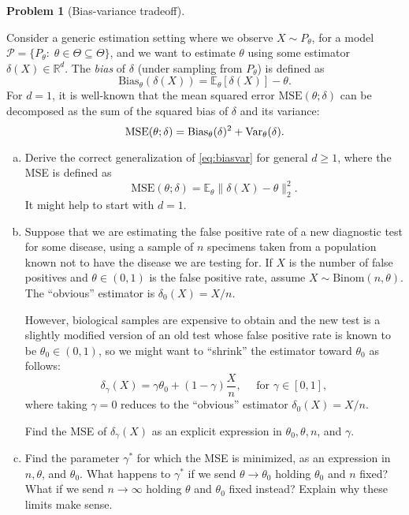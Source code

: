 \documentclass{article}
\newcommand{\cP}{\mathcal{P}}
\newcommand{\EE}{\mathbb{E}}
\newcommand{\RR}{\mathbb{R}}
\newcommand{\Var}{\textnormal{Var}}
\theoremstyle{definition}
\newtheorem{problem}{Problem}
\begin{document}
\begin{problem}[Bias-variance tradeoff]
\label{prob:bias-var}
  
  Consider a generic estimation setting where we observe $X \sim P_\theta$, for a model $\cP = \{P_\theta:\; \theta \in \Theta \subseteq \Theta\}$, and we want to estimate $\theta$ using some estimator $\delta(X) \in \RR^d$. The {\em bias} of $\delta$ (under sampling from $P_\theta$) is defined as
  \[
  \text{Bias}_\theta(\delta(X)) = \EE_\theta[\delta(X)] - \theta. 
  \]
  For $d=1$, it is well-known that the mean squared error $\text{MSE}(\theta; \delta)$ can be decomposed as the sum of the squared bias of $\delta$ and its variance:
  \begin{equation}\label{eq:biasvar}
  \text{MSE}(\theta; \delta) = \text{Bias}_\theta(\delta)^2 + \Var_\theta(\delta).
  \end{equation}
    

  \begin{enumerate}[(a)]
  \item Derive the correct generalization of \eqref{eq:biasvar} for general $d \geq 1$, where the MSE is defined as
    \[
    \text{MSE}(\theta; \delta) = \EE_\theta \|\delta(X) - \theta\|_2^2.
    \]
    It might help to start with $d=1$.

  \item Suppose that we are estimating the false positive rate of a new diagnostic test for some disease, using a sample of $n$ specimens taken from a population known not to have the disease we are testing for. If $X$ is the number of false positives and $\theta \in (0,1)$ is the false positive rate, assume $X \sim \text{Binom}(n, \theta)$. The ``obvious'' estimator is $\delta_0(X) = X/n$.

    However, biological samples are expensive to obtain and the new test is a slightly modified version of an old test whose false positive rate is known to be $\theta_0 \in (0,1)$, so we might want to ``shrink'' the estimator toward $\theta_0$ as follows:
    \[
    \delta_{\gamma}(X) = \gamma \theta_0 + (1-\gamma) \frac{X}{n}, \quad \text{ for } \gamma \in [0,1],
    \]
    where taking $\gamma = 0$ reduces to the ``obvious'' estimator $\delta_0(X) = X/n$.

    Find the MSE of $\delta_\gamma(X)$ as an explicit expression in $\theta_0, \theta, n$, and $\gamma$.
    

  \item Find the parameter $\gamma^*$ for which the MSE is minimized, as an expression in $n, \theta$, and $\theta_0$. What happens to $\gamma^*$ if we send $\theta \to \theta_0$ holding $\theta_0$ and $n$ fixed? What if we send $n\to\infty$ holding $\theta$ and $\theta_0$ fixed instead? Explain why these limits make sense.


\end{enumerate}
\end{problem}
\end{document}
